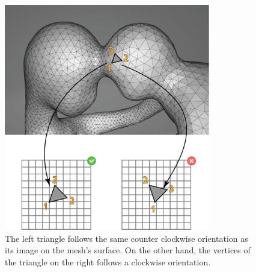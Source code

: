 \begin{figure}[ht]
\centering
\includegraphics[width=9cm]{figures/orientation/orientation.png}
\caption[The Orientation Requirement]{The left triangle follows the same counter clockwise orientation as its image on the mesh's surface. On the other hand, the vertices of the triangle on the right follows a clockwise orientation.}
\label{fig:orientation_req}
\end{figure}